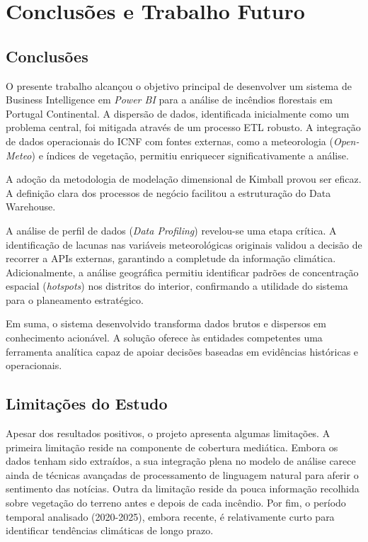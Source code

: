 \section{Conclusões e Trabalho Futuro} \label{sec:concusoes-e-trabalho-futuro}

\subsection{Conclusões} %
O presente trabalho alcançou o objetivo principal de desenvolver um sistema de Business Intelligence em \textit{Power BI} para a análise de incêndios florestais em Portugal Continental.
A dispersão de dados, identificada inicialmente como um problema central, foi mitigada através de um processo ETL robusto.
A integração de dados operacionais do ICNF com fontes externas, como a meteorologia (\textit{Open-Meteo}) e índices de vegetação, permitiu enriquecer significativamente a análise.

A adoção da metodologia de modelação dimensional de Kimball provou ser eficaz.
A definição clara dos processos de negócio facilitou a estruturação do Data Warehouse.

A análise de perfil de dados (\textit{Data Profiling}) revelou-se uma etapa crítica.
A identificação de lacunas nas variáveis meteorológicas originais validou a decisão de recorrer a APIs externas, garantindo a completude da informação climática.
Adicionalmente, a análise geográfica permitiu identificar padrões de concentração espacial (\textit{hotspots}) nos distritos do interior, confirmando a utilidade do sistema para o planeamento estratégico.

Em suma, o sistema desenvolvido transforma dados brutos e dispersos em conhecimento acionável.
A solução oferece às entidades competentes uma ferramenta analítica capaz de apoiar decisões baseadas em evidências históricas e operacionais.

\subsection{Limitações do Estudo}
Apesar dos resultados positivos, o projeto apresenta algumas limitações.
A primeira limitação reside na componente de cobertura mediática. Embora os dados tenham sido extraídos, a sua integração plena no modelo de análise carece ainda de técnicas avançadas de processamento de linguagem natural para aferir o sentimento das notícias.
Outra da limitação reside da pouca informação recolhida sobre vegetação do terreno antes e depois de cada incêndio.
Por fim, o período temporal analisado (2020-2025), embora recente, é relativamente curto para identificar tendências climáticas de longo prazo.

